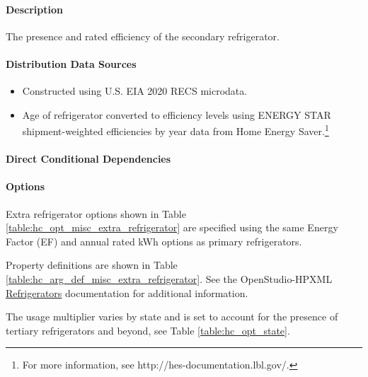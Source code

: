 \paragraph{Description}
% 
The presence and rated efficiency of the secondary refrigerator.

\paragraph{Distribution Data Sources}
% 
\begin{itemize}
\item 

Constructed using U.S. EIA 2020 RECS microdata. 
\item Age of refrigerator converted to efficiency levels using ENERGY STAR shipment-weighted efficiencies by year data from Home Energy Saver.\footnote{For more information, see http://hes-documentation.lbl.gov/.} %
\end{itemize}

\paragraph{Direct Conditional Dependencies}


\paragraph{Options}
Extra refrigerator options shown in Table \ref{table:hc_opt_misc_extra_refrigerator} are specified using the same Energy Factor (EF) and annual rated kWh options as primary refrigerators.



Property definitions are shown in Table \ref{table:hc_arg_def_misc_extra_refrigerator}. See the OpenStudio-HPXML \href{https://openstudio-hpxml.readthedocs.io/en/v1.10.0/workflow_inputs.html#hpxml-refrigerators}{Refrigerators} documentation for additional information.



The usage multiplier varies by state and is set to account for the presence of tertiary refrigerators and beyond, see Table \ref{table:hc_opt_state}.

